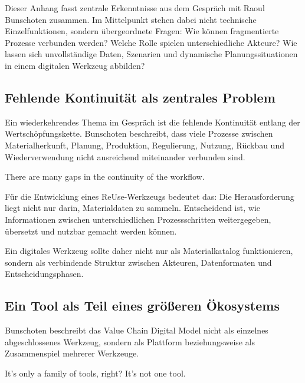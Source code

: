 \label{anlage:interview-bunschoten}

Dieser Anhang fasst zentrale Erkenntnisse aus dem Gespräch mit Raoul Bunschoten zusammen. Im Mittelpunkt stehen dabei nicht technische Einzelfunktionen, sondern übergeordnete Fragen: Wie können fragmentierte Prozesse verbunden werden? Welche Rolle spielen unterschiedliche Akteure? Wie lassen sich unvollständige Daten, Szenarien und dynamische Planungssituationen in einem digitalen Werkzeug abbilden?

\subsection{Fehlende Kontinuität als zentrales Problem}

Ein wiederkehrendes Thema im Gespräch ist die fehlende Kontinuität entlang der Wertschöpfungskette. Bunschoten beschreibt, dass viele Prozesse zwischen Materialherkunft, Planung, Produktion, Regulierung, Nutzung, Rückbau und Wiederverwendung nicht ausreichend miteinander verbunden sind.

\begin{Blockquote}
There are many gaps in the continuity of the workflow.
\end{Blockquote}

Für die Entwicklung eines ReUse-Werkzeugs bedeutet das: Die Herausforderung liegt nicht nur darin, Materialdaten zu sammeln. Entscheidend ist, wie Informationen zwischen unterschiedlichen Prozessschritten weitergegeben, übersetzt und nutzbar gemacht werden können.

Ein digitales Werkzeug sollte daher nicht nur als Materialkatalog funktionieren, sondern als verbindende Struktur zwischen Akteuren, Datenformaten und Entscheidungsphasen.

\subsection{Ein Tool als Teil eines größeren Ökosystems}

Bunschoten beschreibt das Value Chain Digital Model nicht als einzelnes abgeschlossenes Werkzeug, sondern als Plattform beziehungsweise als Zusammenspiel mehrerer Werkzeuge.

\begin{Blockquote}
It's only a family of tools, right? It's not one tool.
\end{Blockquote}

